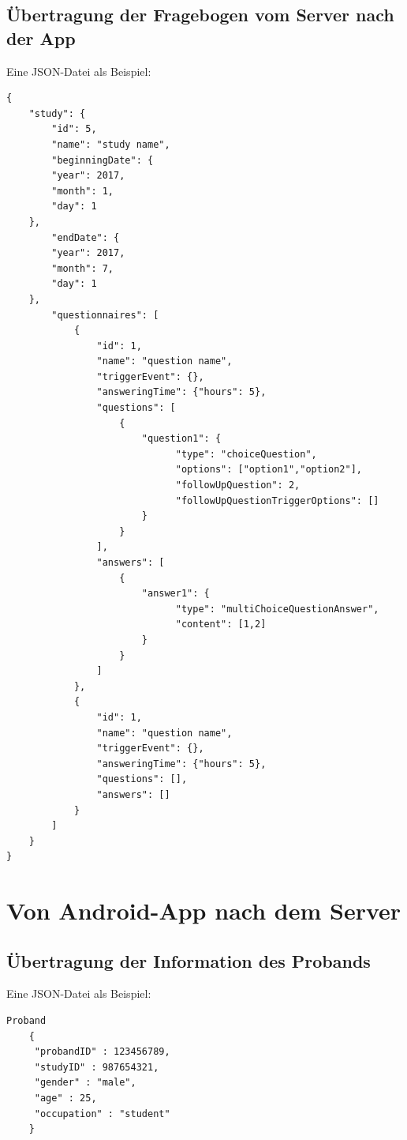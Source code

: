 \documentclass[a4paper]{scrreprt}
\begin{document}
{            \subsection{Übertragung der Fragebogen vom Server nach der App}
                Eine JSON-Datei als Beispiel:
                \begin{lstlisting}
{
    "study": {
        "id": 5,
        "name": "study name",
        "beginningDate": {
        "year": 2017,
        "month": 1,
        "day": 1
    },
        "endDate": {
        "year": 2017,
        "month": 7,
        "day": 1
    },
        "questionnaires": [
            {
                "id": 1,
                "name": "question name",
                "triggerEvent": {},
                "answeringTime": {"hours": 5},
                "questions": [
                    {
                        "question1": {
                              "type": "choiceQuestion",
                              "options": ["option1","option2"],
                              "followUpQuestion": 2,
                              "followUpQuestionTriggerOptions": []
                        }
                    }
                ],
                "answers": [
                    {
                        "answer1": {
                              "type": "multiChoiceQuestionAnswer",
                              "content": [1,2]
                        }
                    }
                ]
            },
            {
                "id": 1,
                "name": "question name",
                "triggerEvent": {},
                "answeringTime": {"hours": 5},
                "questions": [],
                "answers": []
            }
        ]
    }
}
            \end{lstlisting}


        \newpage
        \section{Von Android-App nach dem Server}

            \subsection{Übertragung der Information des Probands}

                Eine JSON-Datei als Beispiel:

\begin{lstlisting}[style=json]
    Proband
    {
     "probandID" : 123456789,
     "studyID" : 987654321,
     "gender" : "male",
     "age" : 25,
     "occupation" : "student"
    }
\end{lstlisting}


}
\end{document}
